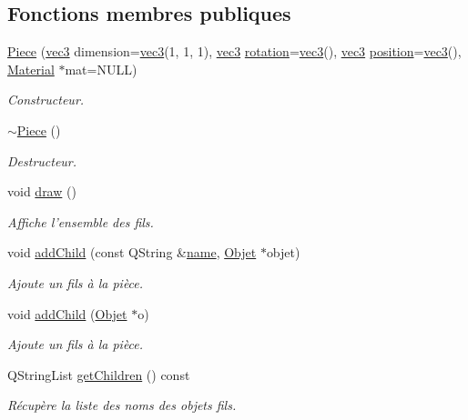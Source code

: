 \subsection*{Fonctions membres publiques}
\begin{DoxyCompactItemize}
\item 
\hyperlink{class_piece_adfc1a07bd6a58ab6cac476fedb38cb15}{Piece} (\hyperlink{structvec3}{vec3} dimension=\hyperlink{structvec3}{vec3}(1, 1, 1), \hyperlink{structvec3}{vec3} \hyperlink{class_objet_ac69a1b459bcb4433099c8cfbff06b209}{rotation}=\hyperlink{structvec3}{vec3}(), \hyperlink{structvec3}{vec3} \hyperlink{class_objet_a0e109bc790b14328202dd2546b04e2fd}{position}=\hyperlink{structvec3}{vec3}(), \hyperlink{class_material}{Material} $\ast$mat=N\+U\+L\+L)
\begin{DoxyCompactList}\small\item\em Constructeur. \end{DoxyCompactList}\item 
\hyperlink{class_piece_a5d7a4f6bade94cb33b6f634de8aa7918}{$\sim$\+Piece} ()
\begin{DoxyCompactList}\small\item\em Destructeur. \end{DoxyCompactList}\item 
void \hyperlink{class_piece_aee937e57fbfe4717aab14e1e892aed2e}{draw} ()
\begin{DoxyCompactList}\small\item\em Affiche l'ensemble des fils. \end{DoxyCompactList}\item 
void \hyperlink{class_piece_adf4f51a5f33071fd0acc706c347f4741}{add\+Child} (const Q\+String \&\hyperlink{class_objet_a4a702c189bedcbf1e65da6aec72c8e44}{name}, \hyperlink{class_objet}{Objet} $\ast$objet)
\begin{DoxyCompactList}\small\item\em Ajoute un fils à la pièce. \end{DoxyCompactList}\item 
void \hyperlink{class_piece_aeb48b4fda2f8950546baf534b3cf08cf}{add\+Child} (\hyperlink{class_objet}{Objet} $\ast$o)
\begin{DoxyCompactList}\small\item\em Ajoute un fils à la pièce. \end{DoxyCompactList}\item 
Q\+String\+List \hyperlink{class_piece_a029823aa5135b356a9e4da14578db4e8}{get\+Children} () const 
\begin{DoxyCompactList}\small\item\em Récupère la liste des noms des objets fils. \end{DoxyCompactList}\item 

\end{DoxyCompactItemize}
